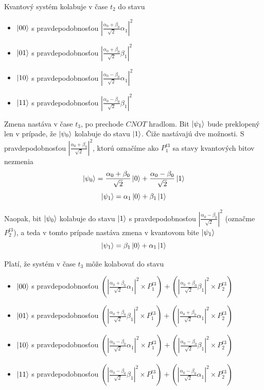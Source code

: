 Kvantový systém kolabuje v čase \(t_2\) do stavu

    \begin{itemize}
        \item[] \(\ket{00}\) s pravdepodobnosťou \(|\frac{\alpha_0 + \beta_0}{\sqrt{2}}\alpha_1|^2\)
        \item[] \(\ket{01}\) s pravdepodobnosťou \(|\frac{\alpha_0 + \beta_0}{\sqrt{2}}\beta_1|^2\)
        \item[] \(\ket{10}\) s pravdepodobnosťou \(|\frac{\alpha_0 - \beta_0}{\sqrt{2}}\alpha_1|^2\)
        \item[] \(\ket{11}\) s pravdepodobnosťou \(|\frac{\alpha_0 - \beta_0}{\sqrt{2}}\beta_1|^2\) 
    \end{itemize}

Zmena nastáva v čase \(t_3\), po prechode \(CNOT\) hradlom. Bit \(\ket{\psi_1}\)
bude preklopený len v prípade, že \(\ket{\psi_0}\) kolabuje do stavu 
\(\ket{1}\). Čiže nastávajú dve možnosti. S pravdepodobnosťou 
\(|\frac{\alpha_0 + \beta_0}{\sqrt{2}}|^2\), ktorú označíme ako \(P^{t3}_1\) sa 
stavy kvantových bitov nezmenia
\[\ket{\psi_0} = \frac{\alpha_0 + \beta_0}{\sqrt{2}}\ket{0} + \frac{\alpha_0 - \beta_0}{\sqrt{2}}\ket{1}\]
\[\ket{\psi_1} = \alpha_1\ket{0} + \beta_1\ket{1}\]

Naopak, bit \(\ket{\psi_0}\) kolabuje do stavu \(\ket{1}\) s pravdepodobnosťou
\(|\frac{\alpha_0 - \beta_0}{\sqrt{2}}|^2\) (označme \(P^{t3}_{2}\)), a teda 
v tomto prípade nastáva zmena v kvantovom bite \(\ket{\psi_1}\)
\[\ket{\psi_1} = \beta_1\ket{0} + \alpha_1\ket{1}\]

Platí, že systém v čase \(t_3\) môže kolabovať do stavu
    \begin{itemize}
        \item[] \(\ket{00}\) s pravdepodobnosťou \((|\frac{\alpha_0 + \beta_0}{\sqrt{2}}\alpha_1|^2 \times P^{t3}_1) + (|\frac{\alpha_0 + \beta_0}{\sqrt{2}}\beta_1|^2 \times P^{t3}_{2})\)
        \item[] \(\ket{01}\) s pravdepodobnosťou \((|\frac{\alpha_0 + \beta_0}{\sqrt{2}}\beta_1|^2 \times P^{t3}_1 ) +(|\frac{\alpha_0 + \beta_0}{\sqrt{2}}\alpha_1|^2 \times P^{t3}_2)\)
        \item[] \(\ket{10}\) s pravdepodobnosťou \((|\frac{\alpha_0 - \beta_0}{\sqrt{2}}\alpha_1|^2 \times P^{t3}_1) +  (|\frac{\alpha_0 - \beta_0}{\sqrt{2}}\beta_1|^2 \times P^{t3}_2)\)
        \item[] \(\ket{11}\) s pravdepodobnosťou \((|\frac{\alpha_0 - \beta_0}{\sqrt{2}}\beta_1|^2 \times P^{t3}_1) +(|\frac{\alpha_0 - \beta_0}{\sqrt{2}}\alpha_1|^2 \times P^{t3}_2)\) 
    \end{itemize}


